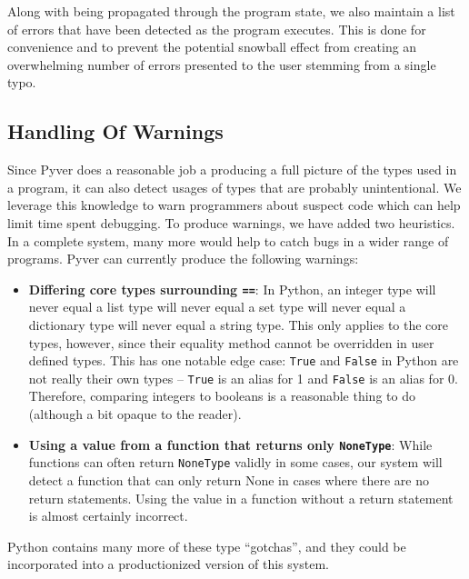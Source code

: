 \documentclass{article}[12pt]
\begin{document}
Along with being propagated through the program state, we also maintain a list of errors that have
been detected as the program executes. This is done for convenience and to prevent the potential
snowball effect from creating an overwhelming number of errors presented to the user stemming from a
single typo.

\subsection{Handling Of Warnings}

Since Pyver does a reasonable job a producing a full picture of the types used in a program, it can
also detect usages of types that are probably unintentional. We leverage this knowledge to warn
programmers about suspect code which can help limit time spent debugging. To produce warnings, we
have added two heuristics. In a complete system, many more would help to catch bugs in a wider range
of programs. Pyver can currently produce the following warnings:

\begin{itemize}
    \item \textbf{Differing core types surrounding \texttt{==}}: In Python, an integer type will never
          equal a list type will never equal a set type will never equal a dictionary type will
          never equal a string type. This only applies to the core types, however, since their
          equality method cannot be overridden in user defined types. This has one notable edge case: \texttt{True} and
          \texttt{False} in
          Python are not really their own types -- \texttt{True} is an alias for 1 and
          \texttt{False} is an alias for 0. Therefore, comparing integers to booleans is a
          reasonable thing to do (although a bit opaque to the reader).

      \item \textbf{Using a value from a function that returns only \texttt{NoneType}}: While functions can often
          return \texttt{NoneType} validly in some cases, our system will detect a function that can only
          return None in cases where there are no return statements. Using the value in a function
          without a return statement is almost certainly incorrect.
\end{itemize}

Python contains many more of these type ``gotchas'', and they could be incorporated into a
productionized version of this system.
\end{document}
